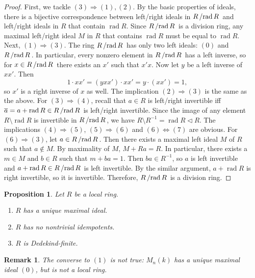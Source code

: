\documentclass[10pt, a4paper]{article}
\newtheorem{proposition}[thm]{Proposition}
\newtheorem*{remark}{Remark}
\newenvironment{noticeC}{%
  \tcolorbox[%
  notitle,
  empty,
  enhanced,  %
  breakable,
  coltext=black, 
  fontupper=\rmfamily,
  noparskip,
  sharp corners,
  boxrule=-1pt,  %
  frame hidden,
  left=7pt,  %
  right=7pt,
  top=5pt,
  bottom=5pt,
  before skip=2.5ex plus 2pt,
  after skip=2.5ex plus 2pt,
  overlay unbroken and last={%
  },
  ]}
{\endtcolorbox}
\newenvironment{myproof}%
  {\begin{noticeC}\begin{proof}}%
  {\end{proof}\end{noticeC}}
\newcommand{\quot}[2]{{\raisebox{0em}{$#1$}\left/\raisebox{0em}{$#2$}\right.}}
\DeclareMathOperator{\rad}{rad}
\begin{document}
\begin{myproof}
    First, we tackle $(3) \Rightarrow (1),(2)$. By the basic properties of ideals, there is a bijective correspondence between 
    left/right ideals in $\quot{R}{\rad R}$ and left/right ideals in $R$ that contain $\rad R$.
    Since $\quot{R}{\rad R}$ is a division ring, any maximal left/right ideal $M$ in $R$ that contains $\rad R$ must be equal to $\rad R$.
    Next, $(1) \Rightarrow (3)$. The ring $\quot{R}{\rad R}$ has only two left ideals: $(0)$ and $\quot{R}{\rad R}$.
    In particular, every nonzero element in $\quot{R}{\rad R}$ has a left inverse, so for $x \in \quot{R}{\rad R}$ there exists an $x'$
    such that $x' x$. Now let $y$ be a left inverse of $x x'$. Then 
    $$1 \cdot x x' = (y xx') \cdot xx' = y \cdot (xx') = 1,$$ so $x'$ is a right inverse of $x$ as well.
    The implication $(2) \Rightarrow (3)$ is the same as the above.
    For $(3) \Rightarrow (4)$, recall that $a \in R$ is left/right invertible iff $\overline{a} = a + \rad R \in \quot{R}{\rad R}$ is left/right invertible.
    Since the image of any element $R \setminus \rad R$ is invertible in $\quot{R}{\rad R}$, we have $R \setminus R^{-1} = \rad R \lhd R$.
    The implications $(4) \Rightarrow (5)$, $(5) \Rightarrow (6)$ and $(6) \Leftrightarrow (7)$ are obvious.
    For $(6) \Rightarrow (3)$, let $a \in \quot{R}{\rad R}$. Then there exists a maximal left ideal $M$ of $R$
    such that $a \notin M$. By maximality of $M$, $M + Ra = R$. In particular, there exists a $m \in M$ and $b \in R$ such that $m + ba = 1$.
    Then $ba \in R^{-1}$, so $a$ is left invertible and $a + \rad R \in \quot{R}{\rad R}$ is left invertible.
    By the similar argument, $a + \rad R$ is right invertible, so it is invertible. Therefore, $\quot{R}{\rad R}$ is a division ring.
\end{myproof}

\begin{proposition}
  Let $R$ be a local ring.
  \begin{enumerate}
    \item $R$ has a unique maximal ideal.
    \item $R$ has no nontrivial idempotents.
    \item $R$ is Dedekind-finite.
  \end{enumerate}
\end{proposition}

\begin{remark}
  The converse to $(1)$ is not true: $M_n (k)$ has a unique maximal ideal $(0)$,
  but is not a local ring.
\end{remark}
\end{document}

